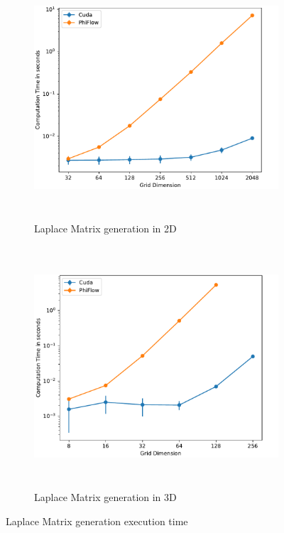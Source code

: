 \begin{figure}[t]
\centering
	\begin{subfigure}[b]{1\textwidth}
		\centering
		\includegraphics[height=9cm, width=14cm]{figures/laplace_2d}

		\caption{Laplace Matrix generation in 2D}
	\end{subfigure}
	\begin{subfigure}[b]{1\textwidth}
		\centering
		\includegraphics[height=9cm, width=14cm]{figures/laplace_3d}

		\caption{Laplace Matrix generation in 3D}
	\end{subfigure}

\caption{Laplace Matrix generation execution time} \label{fig:laplace-bench}
\end{figure}
